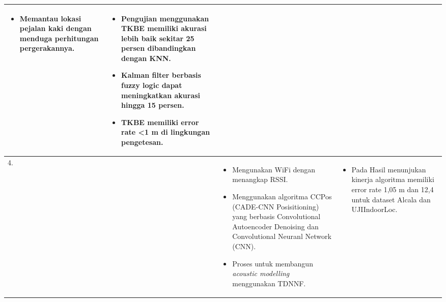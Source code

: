 \begin{longtable}{| m{1cm} | m{2cm} | m{5cm} | m{5cm} |}
\begin{itemize}
    		\item Memantau lokasi pejalan kaki dengan menduga perhitungan pergerakannya.
        \end{itemize} & 
        \begin{itemize}
            \item Pengujian menggunakan TKBE memiliki akurasi lebih baik sekitar 25 persen dibandingkan dengan KNN.
    		\item Kalman filter berbasis fuzzy logic dapat meningkatkan akurasi hingga 15 persen.
    		\item TKBE memiliki error rate <1 m di lingkungan pengetesan.
        \end{itemize} \\
        \hline
        4. & \citet{qin2021ccpos} & 
        \begin{itemize}
            \item Mengunakan WiFi dengan menangkap RSSI.
    		\item Menggunakan algoritma CCPos (CADE-CNN Posisitioning) yang berbasis Convolutional Autoencoder Denoising dan Convolutional Neuranl Network (CNN).
    		\item Proses untuk membangun \textit{acoustic modelling} menggunakan TDNNF.
        \end{itemize} & 
        \begin{itemize}
            \item Pada Hasil menunjukan kinerja algoritma memiliki error rate 1,05 m dan 12,4 untuk dataset Alcala dan UJIIndoorLoc.
        \end{itemize} \\
        \hline
        
\end{longtable}

